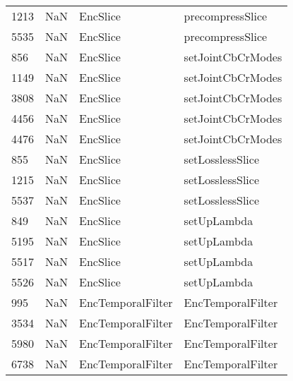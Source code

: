 \begin{tabular}{llll}
1213 &                   NaN &                   EncSlice &                          precompressSlice \\
5535 &                   NaN &                   EncSlice &                          precompressSlice \\
856  &                   NaN &                   EncSlice &                         setJointCbCrModes \\
1149 &                   NaN &                   EncSlice &                         setJointCbCrModes \\
3808 &                   NaN &                   EncSlice &                         setJointCbCrModes \\
4456 &                   NaN &                   EncSlice &                         setJointCbCrModes \\
4476 &                   NaN &                   EncSlice &                         setJointCbCrModes \\
855  &                   NaN &                   EncSlice &                          setLosslessSlice \\
1215 &                   NaN &                   EncSlice &                          setLosslessSlice \\
5537 &                   NaN &                   EncSlice &                          setLosslessSlice \\
849  &                   NaN &                   EncSlice &                               setUpLambda \\
5195 &                   NaN &                   EncSlice &                               setUpLambda \\
5517 &                   NaN &                   EncSlice &                               setUpLambda \\
5526 &                   NaN &                   EncSlice &                               setUpLambda \\
995  &                   NaN &          EncTemporalFilter &                         EncTemporalFilter \\
3534 &                   NaN &          EncTemporalFilter &                         EncTemporalFilter \\
5980 &                   NaN &          EncTemporalFilter &                         EncTemporalFilter \\
6738 &                   NaN &          EncTemporalFilter &                         EncTemporalFilter \\

\end{tabular}
